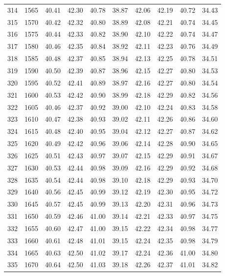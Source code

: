 \begin{longtable}{rrllllllll}
314 & 1565 & 40.41 & 42.30 & 40.78 & 38.87 & 42.06 & 42.19 & 40.72 & 34.43 \\ 
315 & 1570 & 40.42 & 42.32 & 40.80 & 38.89 & 42.08 & 42.21 & 40.74 & 34.45 \\ 
316 & 1575 & 40.44 & 42.33 & 40.82 & 38.90 & 42.10 & 42.22 & 40.74 & 34.47 \\ 
317 & 1580 & 40.46 & 42.35 & 40.84 & 38.92 & 42.11 & 42.23 & 40.76 & 34.49 \\ 
318 & 1585 & 40.48 & 42.37 & 40.85 & 38.94 & 42.13 & 42.25 & 40.78 & 34.51 \\ 
319 & 1590 & 40.50 & 42.39 & 40.87 & 38.96 & 42.15 & 42.27 & 40.80 & 34.53 \\ 
320 & 1595 & 40.52 & 42.41 & 40.89 & 38.97 & 42.16 & 42.27 & 40.80 & 34.54 \\ 
321 & 1600 & 40.53 & 42.42 & 40.90 & 38.99 & 42.18 & 42.29 & 40.82 & 34.56 \\ 
322 & 1605 & 40.46 & 42.37 & 40.92 & 39.00 & 42.10 & 42.24 & 40.83 & 34.58 \\ 
323 & 1610 & 40.47 & 42.38 & 40.93 & 39.02 & 42.11 & 42.26 & 40.86 & 34.60 \\ 
324 & 1615 & 40.48 & 42.40 & 40.95 & 39.04 & 42.12 & 42.27 & 40.87 & 34.62 \\ 
325 & 1620 & 40.49 & 42.42 & 40.96 & 39.06 & 42.14 & 42.28 & 40.90 & 34.65 \\ 
326 & 1625 & 40.51 & 42.43 & 40.97 & 39.07 & 42.15 & 42.29 & 40.91 & 34.67 \\ 
327 & 1630 & 40.53 & 42.44 & 40.98 & 39.09 & 42.16 & 42.29 & 40.92 & 34.68 \\ 
328 & 1635 & 40.54 & 42.44 & 40.98 & 39.10 & 42.18 & 42.29 & 40.93 & 34.70 \\ 
329 & 1640 & 40.56 & 42.45 & 40.99 & 39.12 & 42.19 & 42.30 & 40.95 & 34.72 \\ 
330 & 1645 & 40.57 & 42.45 & 40.99 & 39.13 & 42.20 & 42.31 & 40.96 & 34.73 \\ 
331 & 1650 & 40.59 & 42.46 & 41.00 & 39.14 & 42.21 & 42.33 & 40.97 & 34.75 \\ 
332 & 1655 & 40.60 & 42.47 & 41.00 & 39.15 & 42.22 & 42.34 & 40.98 & 34.77 \\ 
333 & 1660 & 40.61 & 42.48 & 41.01 & 39.15 & 42.24 & 42.35 & 40.98 & 34.79 \\ 
334 & 1665 & 40.63 & 42.50 & 41.02 & 39.17 & 42.24 & 42.36 & 41.00 & 34.80 \\ 
335 & 1670 & 40.64 & 42.50 & 41.03 & 39.18 & 42.26 & 42.37 & 41.01 & 34.82 \\ 

\end{longtable}
